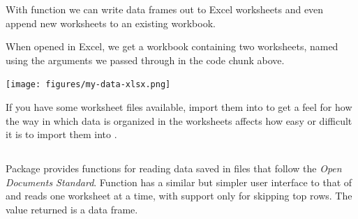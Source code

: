 \documentclass[krantz2]{krantz}\usepackage{knitr}
\begin{document}
With function  we can write data frames out to Excel worksheets and even append new worksheets to an existing workbook.

\begin{knitrout}\footnotesize
{}\color{fgcolor}\begin{kframe}
\begin{alltt}
\hlstd{(}\hlstd{)}
 \hlkwb{<-} \hlstd{(} \hlstd{=} \hlopt{:}\hlstd{,}  \hlstd{= letters[}\hlopt{:}\hlstd{])}
  \hlstd{=} \hlstd{,}  \hlstd{=} \hlstd{)}
  \hlstd{=} \hlstd{,}  \hlstd{=} \hlstd{,}  \hlstd{=} \hlstd{)}
\end{alltt}
\end{kframe}
\end{knitrout}

When opened in Excel, we get a workbook containing two worksheets, named using the arguments we passed through  in the code chunk above.
\begin{center}
\texttt{[image: figures/my-data-xlsx.png]}
\end{center}

\begin{playground}
If you have some worksheet files available, import them into \Rlang to get a feel for how the way in which data is organized in the worksheets affects how easy or difficult it is to import them into \Rlang.
\end{playground}

\subsection[`readODS']{}

Package  provides functions for reading data saved in files that follow the \emph{Open Documents Standard}. Function  has a similar but simpler user interface to that of  and reads one worksheet at a time, with support only for skipping top rows. The value returned is a data frame.
\end{document}
